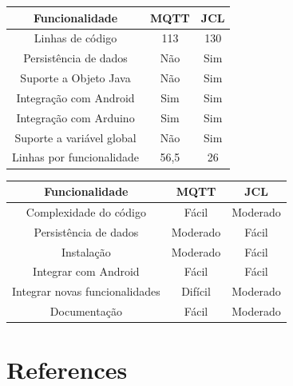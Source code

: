 \documentclass[12pt]{article}
\begin{document}
\begin{table}[]
\begin{tabular}{@{}ccc@{}}
\toprule
Funcionalidade            & MQTT & JCL \\ \midrule
Linhas de código          & 113  & 130 \\
Persistência de dados     & Não  & Sim \\
Suporte a Objeto Java     & Não  & Sim \\
Integração com Android    & Sim  & Sim \\
Integração com Arduino    & Sim  & Sim \\
Suporte a variável global & Não  & Sim \\
\midrule
Linhas por funcionalidade      & 56,5     & 26 \\
\bottomrule
\end{tabular}
\end{table}
\begin{table}[]
\begin{tabular}{@{}ccc@{}}
\toprule
Funcionalidade                 & MQTT     & JCL      \\ \midrule
Complexidade do código         & Fácil    & Moderado \\
Persistência de dados          & Moderado & Fácil    \\
Instalação                     & Moderado & Fácil    \\
Integrar com Android           & Fácil    & Fácil    \\
Integrar novas funcionalidades & Difícil  & Moderado \\
Documentação                   & Fácil    & Moderado \\
\bottomrule
\end{tabular}
\end{table}

\section{References}




\end{document}
